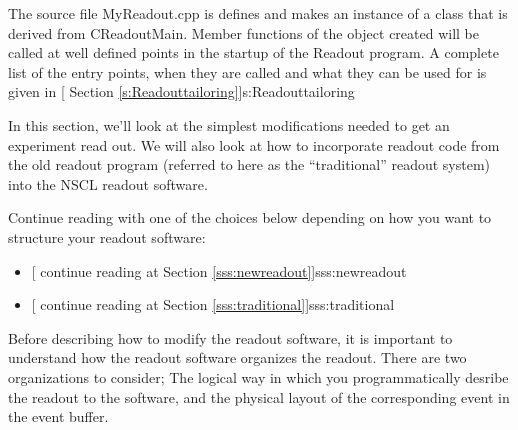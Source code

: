    
      The source file {MyReadout.cpp} is defines and
      makes an instance of a class that is derived from 
      CReadoutMain.  Member functions of the object 
      created will be called at well defined points in the
      startup of the Readout program.  A complete list of
      the entry points, when they are called and what they can
      be used for is given in [
      Section \ref{s:Readouttailoring}]{s:Readouttailoring}
      
      In this section, we'll look at the simplest modifications
      needed to get an experiment read out.  We will also look
      at how to incorporate readout code from the old readout 
      program
      (referred to here as the ``traditional'' readout system)
      into the NSCL readout software.
      
      Continue reading with one of the choices below 
      depending on how
      you want to structure your readout software:
      
      \begin{itemize}
	 \item {}[
	    continue reading at Section 
	    \ref{sss:newreadout}]{sss:newreadout}
	 \item {}[
	    continue reading at Section 
	    \ref{sss:traditional}]{sss:traditional}
      \end{itemize}
      

      
      Before describing how to modify the readout software, it is 
      important to understand how the readout software organizes
      the readout.  There are two organizations to consider; The 
      logical way in which you programmatically desribe the 
      readout to the software, and the physical layout of the
      corresponding event in the event buffer.
      
